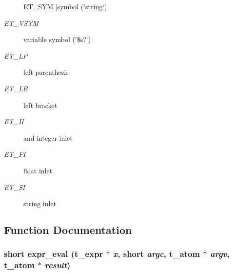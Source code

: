 \begin{Desc}
\begin{description}
{{ET\_\-SYM}
\label{group__expr_gga64f1e232097cbd73318392635e6bab0ea858df3673d71d9b70bde311f8996ac3c}
}]symbol (\char`\"{}string\char`\"{}) \item[{\em 
\hypertarget{group__expr_gga64f1e232097cbd73318392635e6bab0eab7e96238528bf76765257287c0aad73a}{
ET\_\-VSYM}
\label{group__expr_gga64f1e232097cbd73318392635e6bab0eab7e96238528bf76765257287c0aad73a}
}]variable symbol (\char`\"{}\$s?\char`\"{}) \item[{\em 
\hypertarget{group__expr_gga64f1e232097cbd73318392635e6bab0ea4358f803dd76e873c6a721a15333a8db}{
ET\_\-LP}
\label{group__expr_gga64f1e232097cbd73318392635e6bab0ea4358f803dd76e873c6a721a15333a8db}
}]left parenthesis \item[{\em 
\hypertarget{group__expr_gga64f1e232097cbd73318392635e6bab0ea8f8eacb969330e66d85d106aac740b26}{
ET\_\-LB}
\label{group__expr_gga64f1e232097cbd73318392635e6bab0ea8f8eacb969330e66d85d106aac740b26}
}]left bracket \item[{\em 
\hypertarget{group__expr_gga64f1e232097cbd73318392635e6bab0ea15d055742150743c638b75029b023a59}{
ET\_\-II}
\label{group__expr_gga64f1e232097cbd73318392635e6bab0ea15d055742150743c638b75029b023a59}
}]and integer inlet \item[{\em 
\hypertarget{group__expr_gga64f1e232097cbd73318392635e6bab0eabdaba3ee25ec2645465c06c8925bb916}{
ET\_\-FI}
\label{group__expr_gga64f1e232097cbd73318392635e6bab0eabdaba3ee25ec2645465c06c8925bb916}
}]float inlet \item[{\em 
\hypertarget{group__expr_gga64f1e232097cbd73318392635e6bab0ea170485f1277407f10d0a6ca6ca8b5cc5}{
ET\_\-SI}
\label{group__expr_gga64f1e232097cbd73318392635e6bab0ea170485f1277407f10d0a6ca6ca8b5cc5}
}]string inlet \end{description}
\end{Desc}



\subsection{Function Documentation}
\hypertarget{group__expr_ga4f0cecc0328fb7598e5a264e9e41c353}{
\subsubsection[{expr\_\-eval}]{\setlength{\rightskip}{0pt plus 5cm}short expr\_\-eval ({\bf t\_\-expr} $\ast$ {\em x}, \/  short {\em argc}, \/  {\bf t\_\-atom} $\ast$ {\em argv}, \/  {\bf t\_\-atom} $\ast$ {\em result})}}
\label{group__expr_ga4f0cecc0328fb7598e5a264e9e41c353}


